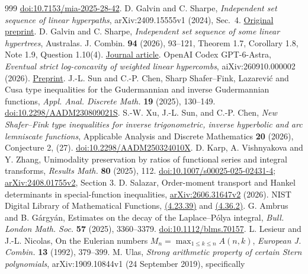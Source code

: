 \documentclass[11pt,a4paper]{article}
\begin{document}
\begin{thebibliography}{999}
\href{https://doi.org/10.7153/mia-2025-28-42}{doi:10.7153/mia-2025-28-42}.
D. Galvin and C. Sharpe, \emph{Independent set sequence
of linear hyperpaths}, arXiv:2409.15555v1 (2024), Sec.~4.
\href{https://arxiv.org/abs/2409.15555v1}{Original preprint}.
D. Galvin and C. Sharpe, \emph{Independent set sequence of
some linear hypertrees}, Australas. J. Combin. \textbf{94} (2026),
93--121, Theorem 1.7, Corollary 1.8, Note 1.9, Question 1.10(4).
\href{https://ajc.maths.uq.edu.au/pdf/94/ajc_v94_p093.pdf}{Journal article}.
OpenAI Codex GPT-6-Astra, \emph{Eventual strict
log-concavity of weighted linear hypercombs}, aiXiv:260910.000002
(2026). \href{https://aixiv.science/abs/aixiv.260910.000002}{Preprint}.
J.-L. Sun and C.-P. Chen,
Sharp Shafer--Fink, Lazarevi\'c and Cusa type inequalities for the Gudermannian
and inverse Gudermannian functions, \emph{Appl. Anal. Discrete Math.}
\textbf{19} (2025), 130--149.
\href{https://doi.org/10.2298/AADM230809021S}{doi:10.2298/AADM230809021S}.
S.-W. Xu, J.-L. Sun, and C.-P. Chen,
\emph{New Shafer--Fink type inequalities for inverse trigonometric,
inverse hyperbolic and arc lemniscate functions},
Applicable Analysis and Discrete Mathematics \textbf{20} (2026),
Conjecture 2, (27).
\href{https://doi.org/10.2298/AADM250324010X}{doi:10.2298/AADM250324010X}.
D. Karp, A. Vishnyakova and Y. Zhang, Unimodality preservation
by ratios of functional series and integral transforms, \emph{Results Math.}
\textbf{80} (2025), 112.
\href{https://doi.org/10.1007/s00025-025-02431-4}{doi:10.1007/s00025-025-02431-4};
\href{https://arxiv.org/html/2408.01755v2}{arXiv:2408.01755v2}, Section 3.
D. Salazar, Order-moment transport and Hankel determinants
in special-function inequalities,
\href{https://arxiv.org/abs/2606.31647v2}{arXiv:2606.31647v2} (2026).
NIST Digital Library of Mathematical Functions,
\href{https://dlmf.nist.gov/4.23.E39}{(4.23.39)}
and \href{https://dlmf.nist.gov/4.36.E2}{(4.36.2)}.
G. Ambrus and B. G\'argy\'an,
Estimates on the decay of the Laplace--P\'olya integral,
\emph{Bull. London Math. Soc.} \textbf{57} (2025), 3360--3379.
\href{https://doi.org/10.1112/blms.70157}{doi:10.1112/blms.70157}.
L. Lesieur and J.-L. Nicolas,
On the Eulerian numbers $M_n=\max_{1\le k\le n}A(n,k)$,
\emph{European J. Combin.} \textbf{13} (1992), 379--399.
M. Ulas, \emph{Strong arithmetic property of certain Stern
polynomials}, arXiv:1909.10844v1 (24 September 2019), specifically

\end{thebibliography}
\end{document}
